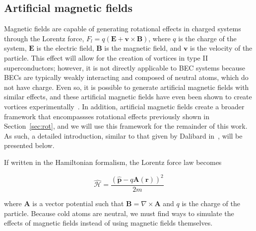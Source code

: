 \subsection{Artificial magnetic fields}
\label{sec:gauge}

Magnetic fields are capable of generating rotational effects in charged systems through the Lorentz force, $F_l = q(\mathbf{E} + \mathbf{v} \times \mathbf{B})$, where $q$ is the charge of the system, $\mathbf{E}$ is the electric field, $\mathbf{B}$ is the magnetic field, and $\mathbf{v}$ is the velocity of the particle.
This effect will allow for the creation of vortices in type II superconductors; however, it is not directly applicable to BEC systems because BECs are typically weakly interacting and composed of neutral atoms, which do not have charge.
Even so, it is possible to generate artificial magnetic fields with similar effects, and these artificial magnetic fields have even been shown to create vortices experimentally~\cite{Lin2009}.
In addition, artificial magnetic fields create a broader framework that encompassses rotational effects previously shown in Section~\ref{sec:rot}, and we will use this framework for the remainder of this work.
As such, a detailed introduction, similar to that given by Dalibard in~\cite{Dalibard2015}, will be presented below.

If written in the Hamiltonian formalism, the Lorentz force law becomes

\begin{equation}
\mathcal{\hat{H}} = \frac{(\mathbf{\hat p} - q\mathbf{A}(\mathbf{r}))^2}{2m}
\end{equation}

\noindent where $\mathbf{A}$ is a vector potential such that $\mathbf{B} = \nabla \times \mathbf{A}$ and $q$ is the charge of the particle.
Because cold atoms are neutral, we must find ways to simulate the effects of magnetic fields instead of using magnetic fields themselves.


